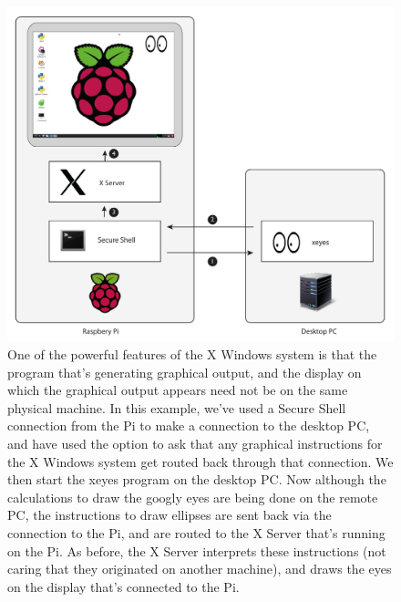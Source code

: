 \begin{figure}
\centerline{\includegraphics[width=17cm]{images/x-via-ssh}}
\caption{One of the powerful features of the X Windows system is that the program that's generating graphical output, and the display on which the graphical output appears need not be on the same physical machine. In this example, we've used a Secure Shell connection from the Pi \protect{} to make a connection to the desktop PC, and have used the  option to ask that any graphical instructions for the X Windows system get routed back through that connection. We then start the xeyes program \protect{} on the desktop PC. Now although the calculations to draw the googly eyes are being done on the remote PC, the instructions to draw ellipses are sent back via the  connection to the Pi, and are \protect{} routed to the X Server that's running on the Pi. As before, the X Server \protect{} interprets these instructions (not caring that they originated on another machine), and draws the eyes on the display that's connected to the Pi.}\label{figure:x-via-ssh}
\end{figure}





